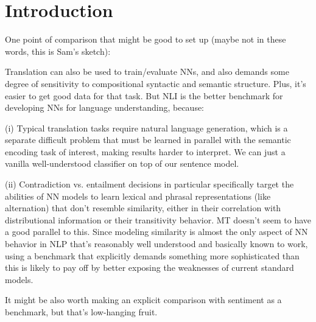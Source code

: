 \section{Introduction}

One point of comparison that might be good to set up (maybe not in these words, this is Sam's sketch):

Translation can also be used to train/evaluate NNs, and also demands some degree of sensitivity to compositional syntactic and semantic structure. Plus, it's easier to get good data for that task. But NLI is the better benchmark for developing NNs for language understanding, because:

(i) Typical translation tasks require natural language generation, which is a separate difficult problem that must be learned in parallel with the semantic encoding task of interest, making results harder to interpret. We can just a vanilla well-understood classifier on top of our sentence model.

(ii) Contradiction vs. entailment decisions in particular specifically target the abilities of NN models to learn lexical and phrasal representations (like alternation) that don't resemble similarity, either in their correlation with distributional information or their transitivity behavior. MT doesn't seem to have a good parallel to this. Since modeling similarity is almost the only aspect of NN behavior in NLP that's reasonably well understood and basically known to work, using a benchmark that explicitly demands something more sophisticated than this is likely to pay off by better exposing the weaknesses of current standard models.

It might be also worth making an explicit comparison with sentiment as a benchmark, but that's low-hanging fruit.